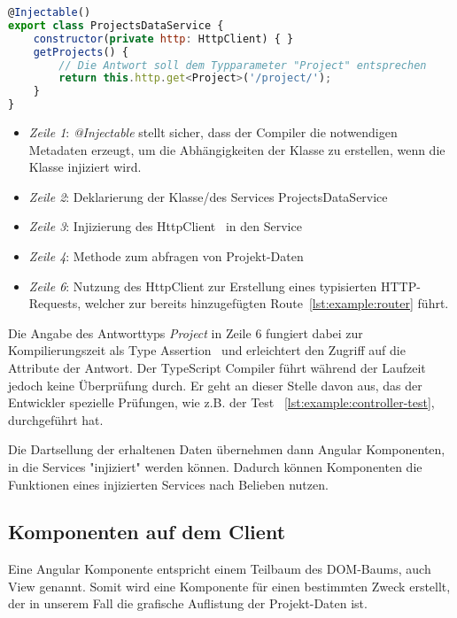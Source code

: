 \begin{lstlisting}[language=JavaScript,float=h!,caption={Funktion zum Abruf aller Projekte vom Server}, label={lst:example:service}]
@Injectable()
export class ProjectsDataService {
    constructor(private http: HttpClient) { }
    getProjects() {
        // Die Antwort soll dem Typparameter "Project" entsprechen
        return this.http.get<Project>('/project/');
    }
}
\end{lstlisting}

\begin{itemize}
    \setlength\itemsep{-1em}
    \item \emph{Zeile 1}: \emph{@Injectable} stellt sicher, dass der Compiler die notwendigen Metadaten erzeugt, um die Abhängigkeiten der Klasse zu erstellen, wenn die Klasse injiziert wird.
    \item \emph{Zeile 2}: Deklarierung der Klasse/des Services ProjectsDataService
    \item \emph{Zeile 3}: Injizierung des HttpClient~\cite{angular-http} in den Service
    \item \emph{Zeile 4}: Methode zum abfragen von Projekt-Daten
    \item \emph{Zeile 6}: Nutzung des HttpClient zur Erstellung eines typisierten HTTP-Requests, welcher zur bereits hinzugefügten Route~\ref{lst:example:router} führt.
\end{itemize}

Die Angabe des Antworttyps \emph{Project} in Zeile 6 fungiert dabei zur Kompilierungszeit als Type Assertion~\cite{typescript-typeassertion}
und erleichtert den Zugriff auf die Attribute der Antwort. Der TypeScript Compiler führt während der Laufzeit jedoch keine Überprüfung durch.
Er geht an dieser Stelle davon aus, das der Entwickler spezielle Prüfungen, wie z.B. der Test ~\ref{lst:example:controller-test}, durchgeführt hat.

Die Dartsellung der erhaltenen Daten übernehmen dann Angular Komponenten, in die Services "injiziert" werden können.
Dadurch können Komponenten die Funktionen eines injizierten Services nach Belieben nutzen.

\subsection{Komponenten auf dem Client}
\label{sec:requirements:example:component}

Eine Angular Komponente entspricht einem Teilbaum des DOM-Baums, auch View genannt.
Somit wird eine Komponente für einen bestimmten Zweck erstellt,
der in unserem Fall die grafische Auflistung der Projekt-Daten ist.

